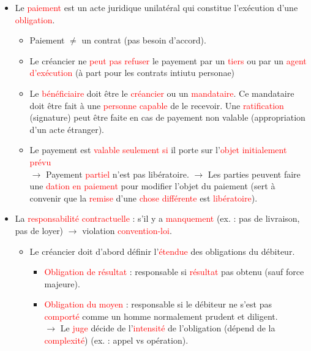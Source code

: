 \begin{itemize}
	\item Le \textcolor{red}{paiement} est un acte juridique unilatéral qui constitue l'exécution d'une \textcolor{red}{obligation}.
	\begin{itemize}
		\item Paiement $\neq$ un contrat (pas besoin d'accord).
		\item Le créancier ne \textcolor{red}{peut pas refuser} le payement par un \textcolor{red}{tiers} ou par un \textcolor{red}{agent d'exécution} (à part pour les contrats intiutu personae)
		\item Le \textcolor{red}{bénéficiaire} doit être le \textcolor{red}{créancier} ou un \textcolor{red}{mandataire}. Ce mandataire doit être fait à une \textcolor{red}{personne capable} de le recevoir. Une \textcolor{red}{ratification} (signature) peut être faite en cas de payement non valable (appropriation d'un acte étranger).
		\item Le payement est \textcolor{red}{valable seulement si} il porte sur l'\textcolor{red}{objet initialement prévu}\\
		$\rightarrow$ Payement \textcolor{red}{partiel} n'est pas libératoire.
		$\rightarrow$ Les parties peuvent faire une \textcolor{red}{dation en paiement} pour modifier l'objet du paiement (sert à convenir que la \textcolor{red}{remise} d'une \textcolor{red}{chose différente} est \textcolor{red}{libératoire}).
	\end{itemize}
	\item La \textcolor{red}{responsabilité contractuelle} : s'il y a \textcolor{red}{manquement} (ex. : pas de livraison, pas de loyer) $\rightarrow$ violation \textcolor{red}{convention-loi}.
	\begin{itemize}
		\item Le créancier doit d'abord définir l'\textcolor{red}{étendue} des obligations du débiteur.
		\begin{itemize}
			\item \textcolor{red}{Obligation de résultat} : responsable si \textcolor{red}{résultat} pas obtenu (sauf force majeure).
			\item \textcolor{red}{Obligation du moyen} : responsable si le débiteur ne s'est pas \textcolor{red}{comporté} comme un homme normalement prudent et diligent.\\
			$\rightarrow$ Le \textcolor{red}{juge} décide de l'\textcolor{red}{intensité} de l'obligation (dépend de la \textcolor{red}{complexité}) (ex. : appel vs opération).

\end{itemize}
\end{itemize}
\end{itemize}
